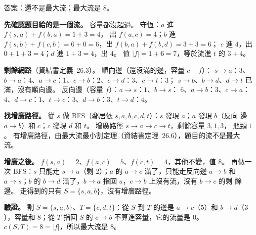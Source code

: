 \begin{pastsoln}
答案：還不是最大流；最大流是 $8$。

\textbf{先確認題目給的是一個流。} 容量都沒超過。 守恆：$a$ 進 $f(s, a) + f(b, a) = 1 + 3 = 4$，
出 $f(a, c) = 4$；$b$ 進 $f(s, b) + f(c, b) = 6 + 0 = 6$，出 $f(b, a) + f(b, d) = 3 + 3 = 6$；
$c$ 進 $4$，出 $0 + 1 + 3 = 4$；$d$ 進 $1 + 3 = 4$，出 $4$。 值 $|f| = 1 + 6 = 7$，等於流進 $t$ 的
$3 + 4$。

\textbf{剩餘網路}（資結書定義~26.3）。 順向邊（還沒滿的邊，容量 $c - f$）：
$s \to a$：$3$、$b \to a$：$4$、$a \to c$：$1$、$c \to b$：$2$、$c \to d$：$3$、$c \to t$：$3$；
$s \to b$、$b \to d$、$d \to t$ 已滿，沒有順向邊。 反向邊（容量 $f$）：$a \to s$：$1$、$b \to s$：
$6$、$a \to b$：$3$、$c \to a$：$4$、$d \to c$：$1$、$t \to c$：$3$、$d \to b$：$3$、$t \to d$：$4$。

\textbf{找增廣路徑。} 從 $s$ 做 BFS（鄰居依 $s, a, b, c, d, t$）：$s$ 發現 $a$；$a$ 發現 $b$（反向
邊 $a \to b$）和 $c$；$c$ 發現 $d$ 和 $t$。 增廣路徑 $s \to a \to c \to t$，剩餘容量 $3, 1, 3$，
瓶頸 $1$。 有增廣路徑，由最大流最小割定理（資結書定理~26.6），題目的流不是最大流。

\textbf{增廣之後。} $f(s, a) = 2$、$f(a, c) = 5$、$f(c, t) = 4$，其他不變，值 $8$。 再做一次
BFS：$s$ 只能走 $s \to a$（剩 $2$）；$a$ 的 $a \to c$ 滿了，只能走反向邊 $a \to b$ 和
$a \to s$；$b$ 的 $b \to d$ 滿了，$b \to a$ 指回 $a$，$c \to b$ 上沒有流，沒有 $b \to c$ 的剩
餘邊。 走得到的只有 $S = \{s, a, b\}$，沒有增廣路徑。

\textbf{驗證。} 割 $S = \{s, a, b\}$、$T = \{c, d, t\}$：從 $S$ 到 $T$ 的邊是 $a \to c$（$5$）和
$b \to d$（$3$），容量和 $8$；從 $T$ 指回 $S$ 的 $c \to b$ 不算進容量，它的流量是 $0$。
$c(S, T) = 8 = |f|$，所以最大流是 $8$。
\end{pastsoln}
